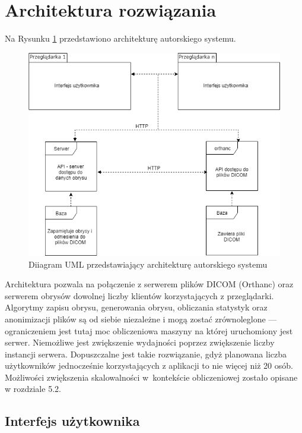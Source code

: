 \documentclass[a4paper,11pt,twoside,openright]{report}
\theoremstyle{definition}
\begin{document}
\section {Architektura rozwiązania}

Na Rysunku \ref{fig:architektura} przedstawiono architekturę autorskiego systemu.

\begin{figure}[h]
	\center
	\includegraphics[width=1\textwidth]{architektura}
	\caption{Diiagram UML przedstawiający architekturę autorskiego systemu}
    	\label{fig:architektura}
\end{figure}

Architektura pozwala na połączenie z serwerem plików DICOM (Orthanc) oraz serwerem obrysów dowolnej liczby klientów korzystających z przeglądarki. Algorytmy zapisu obrysu, generowania obrysu, obliczania statystyk oraz anonimizacji plików są od siebie niezależne i mogą zostać zrównoleglone --- ograniczeniem jest tutaj moc obliczeniowa maszyny na której uruchomiony jest serwer. Niemożliwe jest zwiększenie wydajności poprzez zwiększenie liczby instancji serwera. Dopuszczalne jest takie rozwiązanie, gdyż planowana liczba użytkowników jednocześnie korzystających z aplikacji to nie więcej niż 20 osób. Możliwości zwiększenia skalowalności w~kontekście obliczeniowej zostało opisane w rozdziale 5.2.

\subsection {Interfejs użytkownika}
\end{document}
